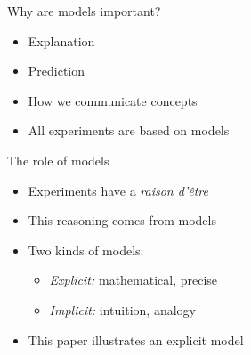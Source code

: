 \documentclass{beamer}
\begin{document}

\begin{frame}{Why are models important?}
    \begin{itemize}
        \item Explanation
        \item Prediction
        \item How we communicate concepts
        \item All experiments are based on models
    \end{itemize}
\end{frame}

\begin{frame}{The role of models}
    \begin{itemize}
        \item Experiments have a \emph{raison d'\^etre}
        \item This reasoning comes from models
        \item Two kinds of models:
            \begin{itemize}
                \item \textit{Explicit:} mathematical, precise
                \item \textit{Implicit:} intuition, analogy
            \end{itemize}
        \item This paper illustrates an explicit model
    \end{itemize}
\end{frame}
\end{document}
